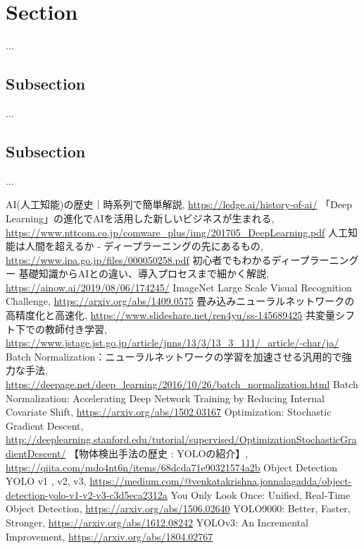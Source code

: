 \documentclass[11pt,a4paper]{jsarticle}
\begin{document}
\section{Section}
...

\subsection{Subsection}
...

\subsection{Subsection}
...


\begin{thebibliography}{9}
	 AI(人工知能)の歴史｜時系列で簡単解説, \url{https://ledge.ai/history-of-ai/}
	 「Deep Learning」の進化でAIを活用した新しいビジネスが生まれる, \url{https://www.nttcom.co.jp/comware_plus/img/201705_DeepLearning.pdf}
	 人工知能は人間を超えるか - ディープラーニングの先にあるもの, \url{https://www.ipa.go.jp/files/000050258.pdf}
	 初心者でもわかるディープラーニング ー 基礎知識からAIとの違い、導入プロセスまで細かく解説, \url{https://ainow.ai/2019/08/06/174245/}
	 ImageNet Large Scale Visual Recognition Challenge, \url{https://arxiv.org/abs/1409.0575}
	 畳み込みニューラルネットワークの高精度化と高速化, \url{https://www.slideshare.net/ren4yu/ss-145689425}
	 共変量シフト下での教師付き学習, \url{https://www.jstage.jst.go.jp/article/jnns/13/3/13_3_111/_article/-char/ja/}
	 Batch Normalization：ニューラルネットワークの学習を加速させる汎用的で強力な手法, \url{https://deepage.net/deep_learning/2016/10/26/batch_normalization.html}
	 Batch Normalization: Accelerating Deep Network Training by Reducing Internal Covariate Shift, \url{https://arxiv.org/abs/1502.03167}
	 Optimization: Stochastic Gradient Descent, \url{http://deeplearning.stanford.edu/tutorial/supervised/OptimizationStochasticGradientDescent/}
	 【物体検出手法の歴史 : YOLOの紹介】, \url{https://qiita.com/mdo4nt6n/items/68dcda71e90321574a2b}
	 Object Detection YOLO v1 , v2, v3, \url{https://medium.com/@venkatakrishna.jonnalagadda/object-detection-yolo-v1-v2-v3-c3d5eca2312a}
	 You Only Look Once: Unified, Real-Time Object Detection, \url{https://arxiv.org/abs/1506.02640}
	 YOLO9000: Better, Faster, Stronger, \url{https://arxiv.org/abs/1612.08242}
	 YOLOv3: An Incremental Improvement, \url{https://arxiv.org/abs/1804.02767}
\end{thebibliography}

%
%
\end{document}
